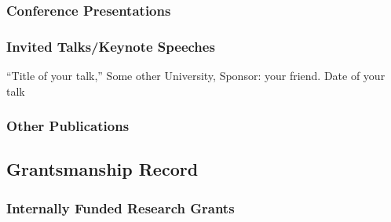 \subsubsection{Conference Presentations}

\subsubsection{Invited Talks/Keynote Speeches}
\begin{outerenum}
\item ``Title of your talk,'' Some other University,
  Sponsor: your friend. Date of your talk
\end{outerenum}

\subsubsection{Other Publications}



\subsection{Grantsmanship Record}


\subsubsection{Internally Funded Research Grants}

